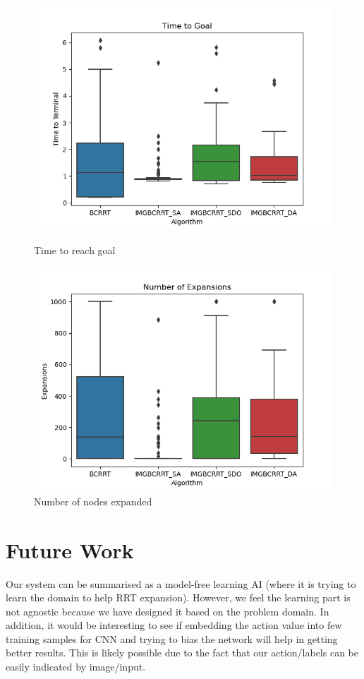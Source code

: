 \documentclass{article}
\begin{document}
\begin{figure}[h]
	\centering
\begin{minipage}{.5\textwidth}
\centering
	\includegraphics[scale=0.45]{TTG1.png}
        \caption{Time to reach goal}
\end{minipage}%
\begin{minipage}{.5\textwidth}
\centering
	\includegraphics[scale=0.45]{Expans1.png}
        \caption{Number of nodes expanded}
\end{minipage}

\end{figure}

\vspace{1cm}
\section{Future Work}
Our system can be summarised as a model-free learning AI (where it is trying to learn the domain to help RRT expansion). However, we feel the learning part is not agnostic because we have designed it based on the problem domain. In addition, it would be interesting to see if embedding the action value into few training samples for CNN and trying to bias the network will help in getting better results. This is likely possible due to the fact that our action/labels can be easily indicated by image/input.
\end{document}

